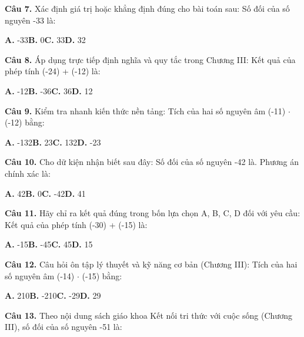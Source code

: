 \documentclass[11pt,a4paper]{article}
\begin{document}
\textbf{\color{primary} Câu 7.} Xác định giá trị hoặc khẳng định đúng cho bài toán sau: Số đối của số nguyên -33 là:\par
\hspace*{1.5em}\textbf{A.} -33\quad\quad \textbf{B.} 0\quad\quad \textbf{C.} 33\quad\quad \textbf{D.} 32\par\vspace{2pt}
\textbf{\color{primary} Câu 8.} Áp dụng trực tiếp định nghĩa và quy tắc trong Chương III: Kết quả của phép tính (-24) + (-12) là:\par
\hspace*{1.5em}\textbf{A.} -12\quad\quad \textbf{B.} -36\quad\quad \textbf{C.} 36\quad\quad \textbf{D.} 12\par\vspace{2pt}
\textbf{\color{primary} Câu 9.} Kiểm tra nhanh kiến thức nền tảng: Tích của hai số nguyên âm (-11) $\cdot$ (-12) bằng:\par
\hspace*{1.5em}\textbf{A.} -132\quad\quad \textbf{B.} 23\quad\quad \textbf{C.} 132\quad\quad \textbf{D.} -23\par\vspace{2pt}
\textbf{\color{primary} Câu 10.} Cho dữ kiện nhận biết sau đây: Số đối của số nguyên -42 là. Phương án chính xác là:\par
\hspace*{1.5em}\textbf{A.} 42\quad\quad \textbf{B.} 0\quad\quad \textbf{C.} -42\quad\quad \textbf{D.} 41\par\vspace{2pt}
\textbf{\color{primary} Câu 11.} Hãy chỉ ra kết quả đúng trong bốn lựa chọn A, B, C, D đối với yêu cầu: Kết quả của phép tính (-30) + (-15) là:\par
\hspace*{1.5em}\textbf{A.} -15\quad\quad \textbf{B.} -45\quad\quad \textbf{C.} 45\quad\quad \textbf{D.} 15\par\vspace{2pt}
\textbf{\color{primary} Câu 12.} Câu hỏi ôn tập lý thuyết và kỹ năng cơ bản (Chương III): Tích của hai số nguyên âm (-14) $\cdot$ (-15) bằng:\par
\hspace*{1.5em}\textbf{A.} 210\quad\quad \textbf{B.} -210\quad\quad \textbf{C.} -29\quad\quad \textbf{D.} 29\par\vspace{2pt}
\textbf{\color{primary} Câu 13.} Theo nội dung sách giáo khoa Kết nối tri thức với cuộc sống (Chương III), số đối của số nguyên -51 là:\par
\end{document}
